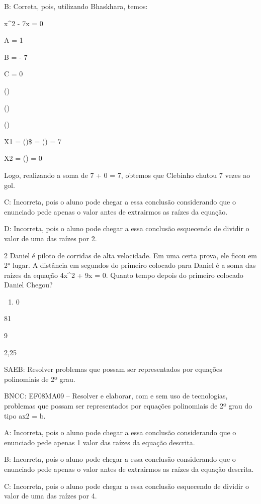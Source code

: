 {B: Correta, pois, utilizando Bhaskhara, temos:

x^2 - 7x = 0

A = 1

B = - 7

C = 0

()

()

()

X1 = ()\$ = () = 7

X2 = () = 0

Logo, realizando a soma de 7 + 0 = 7, obtemos que Clebinho chutou 7
vezes ao gol.

C: Incorreta, pois o aluno pode chegar a essa conclusão considerando que
o enunciado pede apenas o valor antes de extrairmos as raízes da
equação.

D: Incorreta, pois o aluno pode chegar a essa conclusão esquecendo de
dividir o valor de uma das raízes por 2.

\num{2} Daniel é piloto de corridas de alta velocidade. Em uma certa prova,
ele ficou em 2° lugar. A distância em segundos do primeiro colocado para
Daniel é a soma das raízes da equação 4x^2 + 9x = 0. Quanto tempo depois
do primeiro colocado Daniel Chegou?

\begin{enumerate}
\def\labelenumi{\alph{enumi})}
\tightlist
\item
  0
\end{enumerate}
\item 81
\item 9
\item 2,25

SAEB: Resolver problemas que possam ser representados por equações
polinomiais de 2º grau.

BNCC: EF08MA09 -- Resolver e elaborar, com e sem uso de tecnologias,
problemas que possam ser representados por equações polinomiais de 2º
grau do tipo ax2 = b.

A: Incorreta, pois o aluno pode chegar a essa conclusão considerando que
o enunciado pede apenas 1 valor das raízes da equação descrita.

B: Incorreta, pois o aluno pode chegar a essa conclusão considerando que
o enunciado pede apenas o valor antes de extrairmos as raízes da equação
descrita.

C: Incorreta, pois o aluno pode chegar a essa conclusão esquecendo de
dividir o valor de uma das raízes por 4.

}
